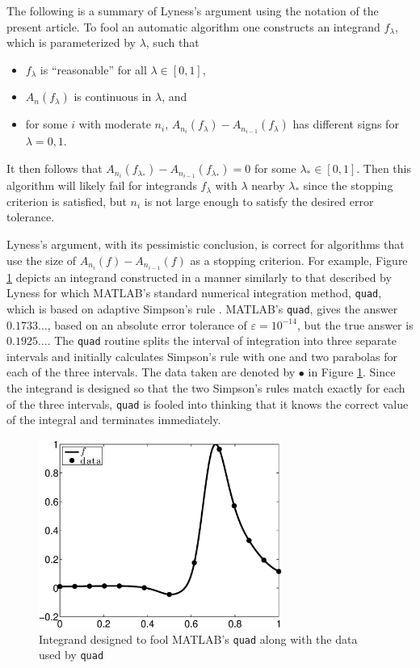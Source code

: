 \documentclass[]{elsarticle}
\theoremstyle{definition}
\theoremstyle{remark}
\begin{document}
The following is a summary of Lyness's argument using the notation of the present article. To fool an automatic algorithm one constructs an integrand $f_\lambda$, which is parameterized by $\lambda$, such that 
\begin{itemize}
\item $f_\lambda$ is ``reasonable'' for all $\lambda \in [0,1]$,
\item $A_n(f_\lambda)$ is continuous in $\lambda$, and 
\item for some $i$ with moderate $n_i$, $A_{n_{i}}(f_\lambda)-A_{n_{i-1}}(f_\lambda)$ has different signs for $\lambda=0,1$.  
\end{itemize}
It then follows that $A_{n_{i}}(f_{\lambda_*})-A_{n_{i-1}}(f_{\lambda_*})=0$ for some $\lambda_* \in [0,1]$.  Then this algorithm will likely fail for integrands $f_{\lambda}$ with $\lambda$ nearby $\lambda_*$ since the stopping criterion is satisfied, but $n_i$ is not large enough to satisfy the desired error tolerance.

Lyness's argument, with its pessimistic conclusion, is correct for algorithms that use the size of $A_{n_{i}}(f)-A_{n_{i-1}}(f)$ as a stopping criterion.  For example, Figure \ref{fig:foolquad} depicts an integrand constructed in a manner similarly to that described by Lyness for which MATLAB's standard numerical integration method, {\tt quad}, which is based on adaptive Simpson's rule  \citep{GanGau00a}.  MATLAB's {\tt quad}, gives the answer $0.1733 \ldots$, based on an absolute error tolerance of $\varepsilon=10^{-14}$, but the true answer is $0.1925 \ldots$.  The {\tt quad} routine splits the interval of integration into three separate intervals and initially calculates Simpson's rule with one and two parabolas for each of the three intervals.  The data taken are denoted by $\bullet$ in Figure \ref{fig:foolquad}.  Since the integrand is designed so that the two Simpson's rules match exactly for each of the three intervals, {\tt quad} is fooled into thinking that it knows the correct value of the integral and terminates immediately.

\begin{figure}
\centering 
\includegraphics[width=8cm]{foolbwquadexample.eps}
\caption{Integrand designed to fool MATLAB's {\tt quad} along with the data used by {\tt quad} \label{fig:foolquad}}
\end{figure}
\end{document}
